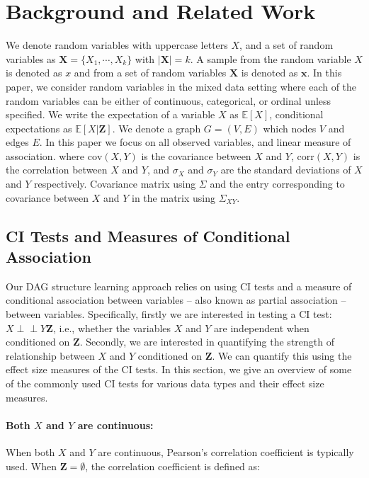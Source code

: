 \documentclass{uai2025} %
\def\ci{\perp\!\!\!\!\!\perp}
\begin{document}
\section{Background and Related Work}
\label{sec:background}
We denote random variables with uppercase letters $ X $, and a set of random
variables as $ \bm{X} = \{X_1, \cdots, X_k\} $ with $ \rvert \bm{X} \rvert = k
$. A sample from the random variable $ X $ is denoted as $ x $ and from a set
of random variables $ \bm{X} $ is denoted as $ \bm{x} $. In this paper, we
consider random variables in the mixed data setting where each of the random
variables can be either of continuous, categorical, or ordinal unless
specified. We write the expectation of a variable $ X $ as $ \mathbb{E}[X] $,
conditional expectations as $ \mathbb{E}[X | \bm{Z}] $. We denote a graph $ G =
(V, E) $ which nodes $ V$ and edges $ E $. In this paper we focus on all
observed variables, and linear measure of association. 
where $ \mathrm{cov}(X, Y) $ is the covariance between $ X $ and $ Y $, $ \mathrm{corr}(X, Y) $ is the correlation between $ X $ and $ Y $, and $
\sigma_X $ and $ \sigma_Y $ are the standard deviations of $ X $ and $ Y $
respectively.  Covariance matrix using $ \Sigma $ and the entry corresponding to
covariance between $ X $ and $ Y $ in the matrix using $ \Sigma_{XY} $.

\subsection{CI Tests and Measures of Conditional Association}
Our DAG structure learning approach relies on using CI tests and a measure of
conditional association between variables -- also known as partial association
-- between variables. Specifically, firstly we are interested in testing a CI
test: $ X \ci Y \bm{Z} $, i.e., whether the variables $ X $ and $ Y $ are
independent when conditioned on $ \bm{Z} $. Secondly, we are interested in
quantifying the strength of relationship between $ X $ and $ Y $ conditioned on
$ \bm{Z} $. We can quantify this using the effect size measures of the CI
tests. In this section, we give an overview of some of the commonly used CI
tests for various data types and their effect size measures.

\paragraph{Both $ X $ and $ Y $ are continuous: }
When both $ X $ and $ Y $ are continuous, Pearson's correlation coefficient is
typically used. When $ \bm{Z} = \emptyset $, the correlation
coefficient is defined as:
\end{document}
